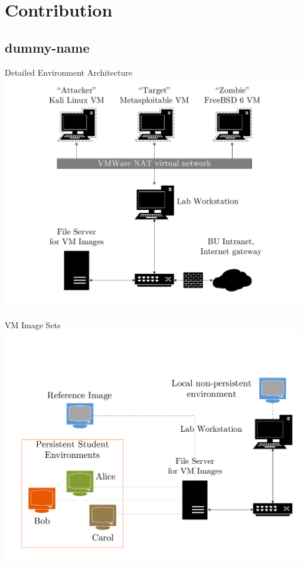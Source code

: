 \documentclass{beamer}
\begin{document}
	\section{Contribution}	
	\subsection{dummy-name}

	\begin{frame}{Detailed Environment Architecture}
		\includegraphics[page=1,width=\textwidth]{../paper/ec521_hostmap.pdf}
	\end{frame}

	\begin{frame}{VM Image Sets}
		\includegraphics[page=1,width=\textwidth,clip=true, trim=0 0 0 1in]{vm-image-sets.pdf}
	\end{frame}
\end{document}
